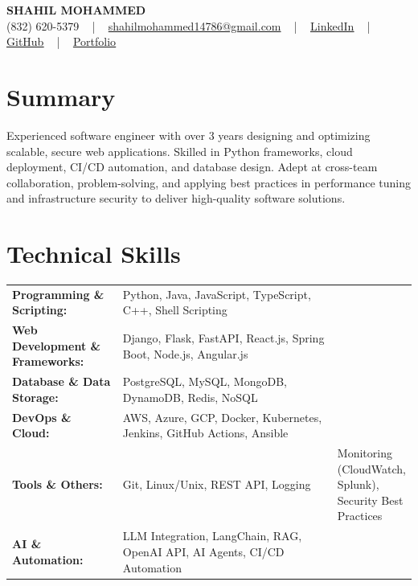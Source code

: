 \documentclass[letterpaper,11pt]{article}
\begin{document}
\begin{center}
    {\fontsize{14pt}{12pt}\selectfont \textbf{\MakeUppercase{Shahil Mohammed}}}\\ \vspace{2pt}
    \fontsize{10pt}{12pt}\selectfont (832) 620-5379 ~ | ~ \href{mailto:shahilmohammed14786@gmail.com}{shahilmohammed14786@gmail.com} ~ | ~  
    \href{https://www.linkedin.com/in/shahil-mohammed-9652931a1/}{\color{blue}\underline{LinkedIn}}  ~ | ~ 
    \href{https://github.com/freakbeast14}{\color{blue}\underline{GitHub}} ~ | ~ 
    \href{https://shahil-mohammed.netlify.app/}{\color{blue}\underline{Portfolio}}
    \vspace{-8pt}
\end{center}

\section{Summary}
\fontsize{9pt}{10pt}\selectfont
Experienced software engineer with over 3 years designing and optimizing scalable, secure web applications. Skilled in Python frameworks, cloud deployment, CI/CD automation, and database design. Adept at cross-team collaboration, problem-solving, and applying best practices in performance tuning and infrastructure security to deliver high-quality software solutions.
 \vspace{-5pt}
 
\section{Technical Skills}
        \vspace{-14pt}
        \begin{table}[h]
            \fontsize{9pt}{10pt}\selectfont
            \begin{tabular}{p{0.3\linewidth} p{0.7\linewidth}}
                \textbf{Programming \& Scripting:} & Python, Java, JavaScript, TypeScript, C++, Shell Scripting \\
                \textbf{Web Development \& Frameworks:} & Django, Flask, FastAPI, React.js, Spring Boot, Node.js, Angular.js \\
                \textbf{Database \& Data Storage:} & PostgreSQL, MySQL, MongoDB, DynamoDB, Redis, NoSQL \\
                \textbf{DevOps \& Cloud:} & AWS, Azure, GCP, Docker, Kubernetes, Jenkins, GitHub Actions, Ansible \\
                \textbf{Tools \& Others:} & Git, Linux/Unix, REST API, Logging & Monitoring (CloudWatch, Splunk), Security Best Practices \\
                \textbf{AI \& Automation:} & LLM Integration, LangChain, RAG, OpenAI API, AI Agents, CI/CD Automation \\
            \end{tabular}
        \end{table}
 \vspace{-15pt}
 
\end{document}
